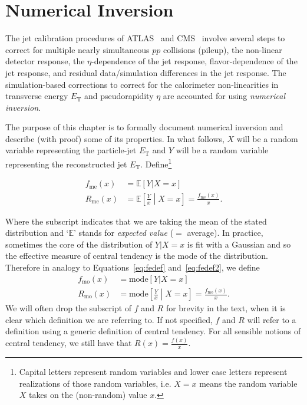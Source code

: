 \section{Numerical Inversion}
\label{sec:numinversion}

The jet calibration procedures of ATLAS~\cite{Aad:2011he} and CMS~\cite{Chatrchyan:2011ds,Khachatryan:2016kdb} involve several steps to correct for multiple nearly simultaneous $pp$ collisions (pileup), the non-linear detector response, the $\eta$-dependence of the jet response, flavor-dependence of the jet response, and residual data/simulation differences in the jet response.  The simulation-based corrections to correct for the calorimeter non-linearities in transverse energy $E_\text{T}$ and pseudorapidity $\eta$ are accounted for using {\it numerical inversion}.

The purpose of this chapter is to formally document numerical inversion and describe (with proof) some of its properties.   In what follows, $X$ will be a random variable representing the particle-jet $E_\text{T}$ and $Y$ will be a random variable representing the reconstructed jet $E_\text{T}$.  Define\footnote{Capital letters represent random variables and lower case letters represent realizations of those random variables, i.e. $X=x$ means the random variable $X$ takes on the (non-random) value $x$.}

\begin{align}
\label{eq:fedef}
f_\text{me}(x)&=\mathbb{E}[Y|X=x]\\\label{eq:fedef2}
R_\text{me}(x) &= \mathbb{E}\left[\frac{Y}{x}\middle| X=x\right] = \frac{f_\text{me}(x)}{x}. 
\end{align}

Where the subscript indicates that we are taking the mean of the stated distribution and `$\mathbb{E}$' stands for {\it expected value} ($=$ average). In practice, sometimes the core of the distribution of $Y|X=x$ is fit with a Gaussian and so the effective measure of central tendency is the mode of the distribution.  Therefore in analogy to Equations~\ref{eq:fedef} and~\ref{eq:fedef2}, we define
\begin{align}
f_\text{mo}(x)&=\text{mode}[Y|X=x]\\
R_\text{mo}(x) &= \text{mode}\left[\frac{Y}{x}\middle| X=x\right] = \frac{f_\text{mo}(x)}{x}. 
\end{align}
We will often drop the subscript of $f$ and $R$ for brevity in the text, when it is clear which definition we are referring to. If not specified, $f$ and $R$ will refer to a definition using a generic definition of central tendency.  For all sensible notions of central tendency, we still have that $R(x) = \frac{f(x)}{x}$.

